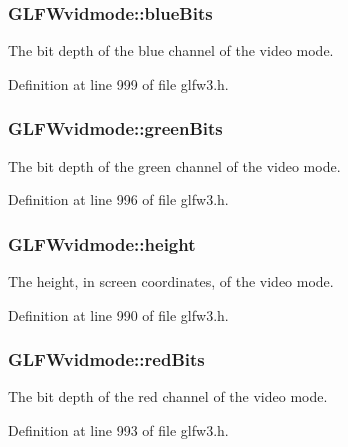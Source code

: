 \subsubsection[{blue\+Bits}]{ G\+L\+F\+Wvidmode\+::blue\+Bits}\label{struct_g_l_f_wvidmode_af310977f58d2e3b188175b6e3d314047}
The bit depth of the blue channel of the video mode. 

Definition at line 999 of file glfw3.\+h.

\hypertarget{struct_g_l_f_wvidmode_a292fdd281f3485fb3ff102a5bda43faa}{}
\subsubsection[{green\+Bits}]{ G\+L\+F\+Wvidmode\+::green\+Bits}\label{struct_g_l_f_wvidmode_a292fdd281f3485fb3ff102a5bda43faa}
The bit depth of the green channel of the video mode. 

Definition at line 996 of file glfw3.\+h.

\hypertarget{struct_g_l_f_wvidmode_ac65942a5f6981695517437a9d571d03c}{}
\subsubsection[{height}]{ G\+L\+F\+Wvidmode\+::height}\label{struct_g_l_f_wvidmode_ac65942a5f6981695517437a9d571d03c}
The height, in screen coordinates, of the video mode. 

Definition at line 990 of file glfw3.\+h.

\hypertarget{struct_g_l_f_wvidmode_a6066c4ecd251098700062d3b735dba1b}{}
\subsubsection[{red\+Bits}]{ G\+L\+F\+Wvidmode\+::red\+Bits}\label{struct_g_l_f_wvidmode_a6066c4ecd251098700062d3b735dba1b}
The bit depth of the red channel of the video mode. 

Definition at line 993 of file glfw3.\+h.

